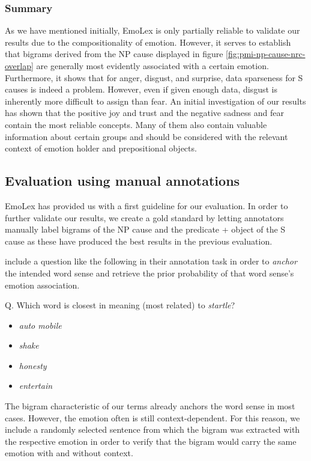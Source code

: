 \subsubsection{Summary}

As we have mentioned initially, EmoLex is only partially reliable to validate our results due to the compositionality of emotion. However, it serves to establish that bigrams derived from the NP cause displayed in figure \ref{fig:pmi-np-cause-nrc-overlap} are generally most evidently associated with a certain emotion. Furthermore, it shows that for anger, disgust, and surprise, data sparseness for S causes is indeed a problem. However, even if given enough data, disgust is inherently more difficult to assign than fear. An initial investigation of our results has shown that the positive joy and trust and the negative sadness and fear contain the most reliable concepts. Many of them also contain valuable information about certain groups and should be considered with the relevant context of emotion holder and prepositional objects.

\subsection{Evaluation using manual annotations}

EmoLex has provided us with a first guideline for our evaluation. In order to further validate our results, we create a gold standard by letting annotators manually label bigrams of the NP cause and the predicate + object of the S cause as these have produced the best results in the previous evaluation.

\citeauthor{nrc} include a question like the following in their annotation task in order to \textit{anchor} the intended word sense and retrieve the prior probability of that word sense's emotion association.

Q. Which word is closest in meaning (most related) to \textit{startle}?
\begin{itemize}[noitemsep,nolistsep]
	\item \textit{auto mobile}
	\item \textit{shake}
	\item \textit{honesty}
	\item \textit{entertain}
\end{itemize}

The bigram characteristic of our terms already anchors the word sense in most cases. However, the emotion often is still context-dependent. For this reason, we include a randomly selected sentence from which the bigram was extracted with the respective emotion in order to verify that the bigram would carry the same emotion with and without context.

